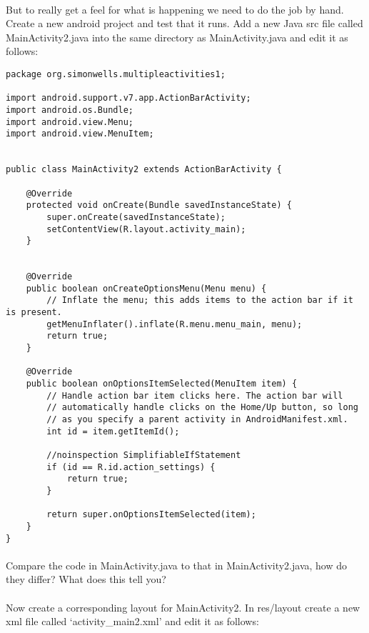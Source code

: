 \paragraph{} But to really get a feel for what is happening we need to do the job by hand. Create a new android project and test that it runs. Add a new Java src file called MainActivity2.java into the same directory as MainActivity.java and edit it as follows:

\begin{lstlisting}
package org.simonwells.multipleactivities1;

import android.support.v7.app.ActionBarActivity;
import android.os.Bundle;
import android.view.Menu;
import android.view.MenuItem;


public class MainActivity2 extends ActionBarActivity {

    @Override
    protected void onCreate(Bundle savedInstanceState) {
        super.onCreate(savedInstanceState);
        setContentView(R.layout.activity_main);
    }


    @Override
    public boolean onCreateOptionsMenu(Menu menu) {
        // Inflate the menu; this adds items to the action bar if it is present.
        getMenuInflater().inflate(R.menu.menu_main, menu);
        return true;
    }

    @Override
    public boolean onOptionsItemSelected(MenuItem item) {
        // Handle action bar item clicks here. The action bar will
        // automatically handle clicks on the Home/Up button, so long
        // as you specify a parent activity in AndroidManifest.xml.
        int id = item.getItemId();

        //noinspection SimplifiableIfStatement
        if (id == R.id.action_settings) {
            return true;
        }

        return super.onOptionsItemSelected(item);
    }
}
\end{lstlisting}
\paragraph{} Compare the code in MainActivity.java to that in MainActivity2.java, how do they differ? What does this tell you?

\paragraph{} Now create a corresponding layout for MainActivity2. In res/layout create a new xml file called `activity\_main2.xml' and edit it as follows:

